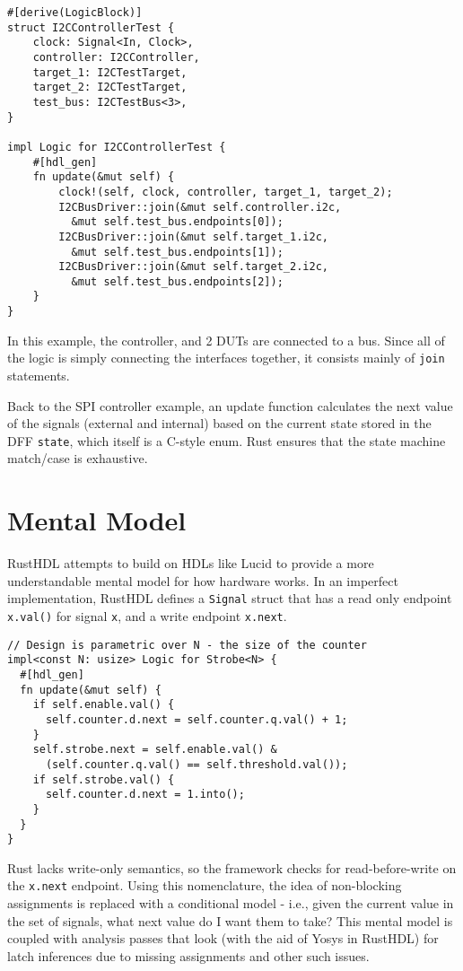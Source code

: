 \documentclass[sigplan,screen,sigconf]{acmart}
\begin{document}
\begin{verbatim}
#[derive(LogicBlock)]
struct I2CControllerTest {
    clock: Signal<In, Clock>,
    controller: I2CController,
    target_1: I2CTestTarget,
    target_2: I2CTestTarget,
    test_bus: I2CTestBus<3>,
}

impl Logic for I2CControllerTest {
    #[hdl_gen]
    fn update(&mut self) {
        clock!(self, clock, controller, target_1, target_2);
        I2CBusDriver::join(&mut self.controller.i2c, 
          &mut self.test_bus.endpoints[0]);
        I2CBusDriver::join(&mut self.target_1.i2c,
          &mut self.test_bus.endpoints[1]);
        I2CBusDriver::join(&mut self.target_2.i2c, 
          &mut self.test_bus.endpoints[2]);
    }
}
\end{verbatim}

In this example, the controller, and 2 DUTs are connected to a bus.  Since all of the logic is simply connecting the interfaces together, it consists mainly of \verb|join| statements. 

Back to the SPI controller example, an update function calculates the next value of the 
signals (external and internal) based on the current state stored in the DFF \verb|state|,
which itself is a C-style enum.  Rust ensures that the state machine match/case is exhaustive. 

\section{Mental Model}
RustHDL attempts to build on HDLs like Lucid\cite{b11} to provide a more understandable mental model for how hardware works.  In an imperfect implementation, RustHDL defines a \verb|Signal| struct that has a read only endpoint \verb|x.val()| for signal \verb|x|, and a write endpoint \verb|x.next|.  

\begin{verbatim}
// Design is parametric over N - the size of the counter
impl<const N: usize> Logic for Strobe<N> {
  #[hdl_gen]
  fn update(&mut self) {
    if self.enable.val() {
      self.counter.d.next = self.counter.q.val() + 1;
    }
    self.strobe.next = self.enable.val() & 
      (self.counter.q.val() == self.threshold.val());
    if self.strobe.val() {
      self.counter.d.next = 1.into();
    }
  }
} 
\end{verbatim}

Rust lacks write-only semantics, so the framework checks for read-before-write on the \verb|x.next| endpoint.  Using this nomenclature, the idea of non-blocking assignments is replaced with a conditional model - i.e., given the current value in the set of signals, what next value do I want them to take?  This mental model is coupled with analysis passes that look (with the aid of Yosys\cite{b12} in RustHDL) for latch inferences due to missing assignments and other such issues.
\end{document}
